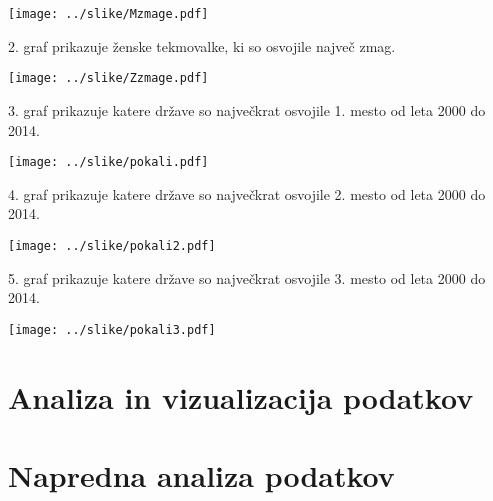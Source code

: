 \documentclass[11pt,a4paper]{article}
\begin{document}
\texttt{[image: ../slike/Mzmage.pdf]}

2. graf prikazuje ženske tekmovalke, ki so osvojile največ zmag.

\texttt{[image: ../slike/Zzmage.pdf]}

3. graf prikazuje katere države so največkrat osvojile 1. mesto od leta 2000 do 2014.

\texttt{[image: ../slike/pokali.pdf]}

4. graf prikazuje katere države so največkrat osvojile 2. mesto od leta 2000 do 2014.

\texttt{[image: ../slike/pokali2.pdf]}

5. graf prikazuje katere države so največkrat osvojile 3. mesto od leta 2000 do 2014.

\texttt{[image: ../slike/pokali3.pdf]}


\section{Analiza in vizualizacija podatkov}


\section{Napredna analiza podatkov}

\end{document}
